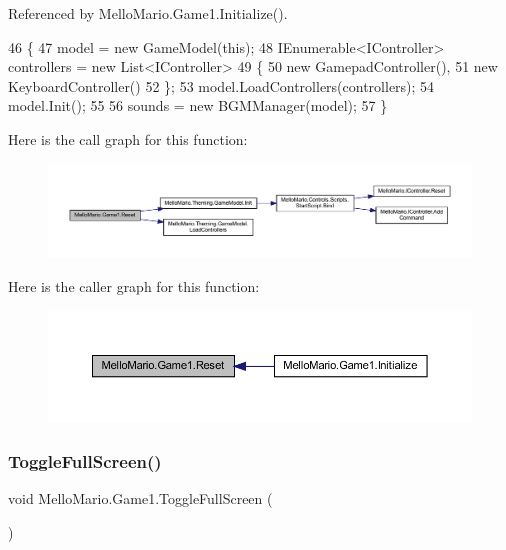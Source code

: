 Referenced by Mello\+Mario.\+Game1.\+Initialize().


\begin{DoxyCode}
46         \{
47             model = \textcolor{keyword}{new} GameModel(\textcolor{keyword}{this});
48             IEnumerable<IController> controllers = \textcolor{keyword}{new} List<IController>
49             \{
50                 \textcolor{keyword}{new} GamepadController(),
51                 \textcolor{keyword}{new} KeyboardController()
52             \};
53             model.LoadControllers(controllers);
54             model.Init();
55 
56             sounds = \textcolor{keyword}{new} BGMManager(model);
57         \}
\end{DoxyCode}
Here is the call graph for this function\+:
\nopagebreak
\begin{figure}[H]
\begin{center}
\leavevmode
\includegraphics[width=350pt]{classMelloMario_1_1Game1_a3ae863c0c57d5b278bfc755bb5d59b03_cgraph}
\end{center}
\end{figure}
Here is the caller graph for this function\+:
\nopagebreak
\begin{figure}[H]
\begin{center}
\leavevmode
\includegraphics[width=350pt]{classMelloMario_1_1Game1_a3ae863c0c57d5b278bfc755bb5d59b03_icgraph}
\end{center}
\end{figure}
\mbox{\label{classMelloMario_1_1Game1_ab6099a259f13138921426c8579e72b32}} 
\subsubsection{Toggle\+Full\+Screen()}
{\footnotesize\ttfamily void Mello\+Mario.\+Game1.\+Toggle\+Full\+Screen (\begin{DoxyParamCaption}{ }\end{DoxyParamCaption})}



